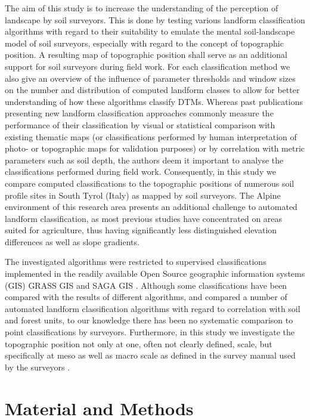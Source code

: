 \documentclass[preprint,12pt,authoryear]{elsarticle}
\begin{document}
The aim of this study is to increase the understanding of the perception of landscape by soil surveyors. This is done by testing various landform classification algorithms with regard to their suitability to emulate the mental soil-landscape model of soil surveyors, especially with regard to the concept of topographic position. A resulting map of topographic position shall serve as an additional support for soil surveyors during field work. For each classification method we also give an overview of the influence of parameter thresholds and window sizes on the number and distribution of computed landform classes to allow for better understanding of how these algorithms classify DTMs. Whereas past publications presenting new landform classification approaches commonly measure the performance of their classification by visual or statistical comparison with existing thematic maps (or classifications performed by human interpretation of photo- or topographic maps for validation purposes) or by correlation with metric parameters such as soil depth, the authors deem it important to analyse the classifications performed during field work. Consequently, in this study we compare computed classifications to the topographic positions of numerous soil profile sites in South Tyrol (Italy) as mapped by soil surveyors. The Alpine environment of this research area presents an additional challenge to automated landform classification, as most previous studies have concentrated on areas suited for agriculture, thus having significantly less distinguished elevation differences as well as slope gradients.

The investigated algorithms were restricted to supervised classifications implemented in the readily available Open Source geographic information systems (GIS) GRASS GIS \citep{GRASS_GIS_software} and SAGA GIS \citep{conrad2015system}.  Although some classifications have been compared with the results of different algorithms, and \cite{Barka2011} compared a number of automated landform classification algorithms with regard to correlation with soil and forest units, to our knowledge there has been no systematic comparison to point classifications by surveyors. Furthermore, in this study we investigate the topographic position not only at one, often not clearly defined, scale, but specifically at meso as well as macro scale as defined in the survey manual used by the surveyors \citep{Englisch1998}.

\section{Material and Methods}
\end{document}
